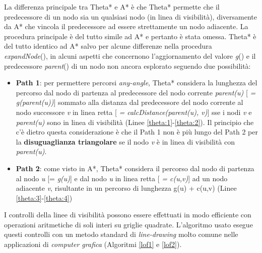 \documentclass[12pt]{book}
\begin{document}
\par{
La differenza principale tra Theta* e  A* \`e che Theta* permette che il predecessore di un nodo sia un qualsiasi nodo (in linea di visibilit\`a), diversamente da A* che vincola il predecessore ad essere strettamente un nodo adiacente. La procedura principale \`e del tutto simile ad A* e pertanto \`e stata omessa. Theta* \`e del tutto identico ad A* salvo per alcune differenze nella procedura \emph{expandNode}(), in alcuni aspetti che concernono l'aggiornamento del valore \emph{g}() e il predecessore \emph{parent}() di un nodo non ancora esplorato seguendo due possibilit\`a:
\begin{itemize}
\item \textbf{Path 1}: per permettere percorsi \emph{any-angle}, Theta* considera la lunghezza del percorso dal nodo di partenza al predecessore del nodo corrente \emph{parent(u)} [ \emph{= g(parent(u))}] sommato alla distanza dal predecessore del nodo corrente al nodo successore \emph{v} in linea retta [ \emph{= calcDistance(parent(u), v)}] sse i nodi \emph{v} e \emph{parent(u)} sono in linea di visibilit\`a (Linee \ref{theta:1}-\ref{theta:2}). Il principio che c'\`e dietro questa considerazione \`e che il Path 1 non \`e pi\`u lungo del Path 2 per la \textbf{disuguaglianza triangolare} se il nodo \emph{v} \`e in linea di visibilit\`a con \emph{parent(u)}.
\item \textbf{Path 2}: come visto in A*, Theta* considera il percorso dal nodo di partenza al nodo \emph{u} [= \emph{g(u)}] e dal nodo \emph{u} in linea retta [ \emph{= c(u,v)}] ad un nodo adiacente \emph{v}, risultante in un percorso di lunghezza g(u) + c(u,v) (Linee \ref{theta:3}-\ref{theta:4})

\end{itemize}
}
\par{I controlli della linee di visibilit\`a possono essere effettuati in modo efficiente con operazioni aritmetiche di soli interi su griglie quadrate. L'algoritmo usato esegue questi controlli con un metodo standard di \emph{line-drawing} molto comune nelle applicazioni di \emph{computer grafica} (Algoritmi \ref{lof1} e \ref{lof2}).}
\iffalse
\end{document}
